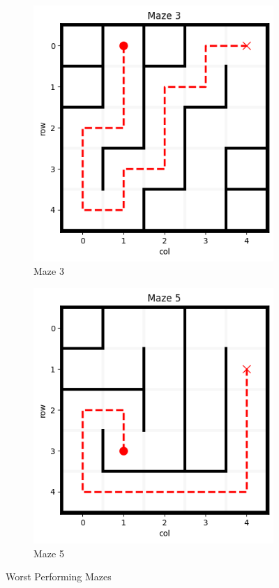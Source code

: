 \documentclass[conference]{IEEEtran}
\begin{document}
\begin{figure}[htbp]
  \centering
  \begin{subfigure}[b]{0.45\columnwidth}
    \centering
\includegraphics[width=\textwidth]{../mazes/gen_dfs_5x5/figures/maze3.png}
    \caption{Maze 3}
    \label{fig:maze3}
  \end{subfigure}
  \hfill
  \begin{subfigure}[b]{0.45\columnwidth}
    \centering
    \includegraphics[width=\textwidth]{../mazes/gen_dfs_5x5/figures/maze5.png}
    \caption{Maze 5}
    \label{fig:maze5}
  \end{subfigure}
  \caption{Worst Performing Mazes}
  \label{fig:worst_mazes}
\end{figure}
\end{document}
